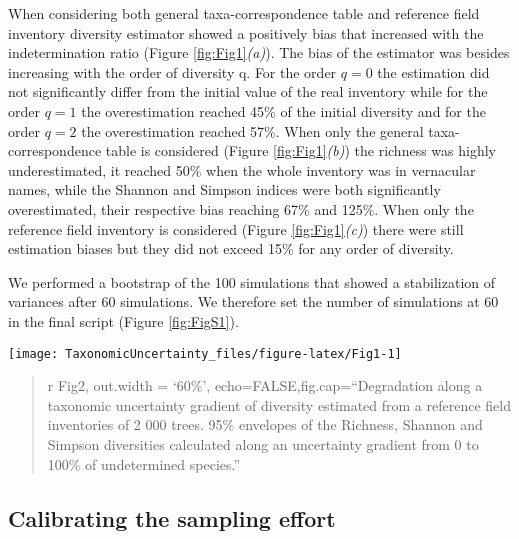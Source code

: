 \documentclass[fleqn,10pt]{ArtEcoFoG} %
\begin{document}
When considering both general taxa-correspondence table and reference
field inventory diversity estimator showed a positively bias that
increased with the indetermination ratio (Figure
\ref{fig:Fig1}\emph{(a)}). The bias of the estimator was besides
increasing with the order of diversity q. For the order \(q = 0\) the
estimation did not significantly differ from the initial value of the
real inventory while for the order \(q = 1\) the overestimation reached
45\% of the initial diversity and for the order \(q = 2\) the
overestimation reached 57\%. When only the general taxa-correspondence
table is considered (Figure \ref{fig:Fig1}\emph{(b)}) the richness was
highly underestimated, it reached 50\% when the whole inventory was in
vernacular names, while the Shannon and Simpson indices were both
significantly overestimated, their respective bias reaching 67\% and
125\%. When only the reference field inventory is considered (Figure
\ref{fig:Fig1}\emph{(c)}) there were still estimation biases but they
did not exceed 15\% for any order of diversity.

We performed a bootstrap of the 100 simulations that showed a
stabilization of variances after 60 simulations. We therefore set the
number of simulations at 60 in the final script (Figure
\ref{fig:FigS1}).

\begin{figure*}
\texttt{[image: TaxonomicUncertainty\_files/figure-latex/Fig1-1]} \caption{Indices degradation along a taxonomic uncertainty gradient. 95\% envelopes of the Richness, Shannon and Simpson indices calculated through our propagation method along an uncertainty gradient from 0 to 100\% of undetermined species. In (a) Only expert prior is considered to compute the association frequencies, in (b) both expert and observation prior are equally accounted for in the propagation method and in (c) only the observation prior is considered.}\label{fig:Fig1}
\end{figure*}

\begin{quote}
r Fig2, out.width = `60\%', echo=FALSE,fig.cap=``Degradation along a
taxonomic uncertainty gradient of diversity estimated from a reference
field inventories of 2 000 trees. 95\% envelopes of the Richness,
Shannon and Simpson diversities calculated along an uncertainty gradient
from 0 to 100\% of undetermined species.''
\end{quote}

\subsection{Calibrating the sampling
effort}\label{calibrating-the-sampling-effort}
\end{document}
